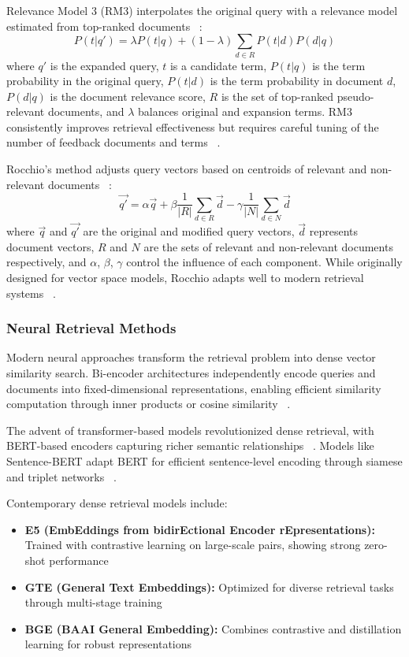 \documentclass[preprint,12pt]{elsarticle}
\begin{document}
Relevance Model 3 (RM3) interpolates the original query with a relevance model estimated from top-ranked documents ~\cite{abdul2004umass}:
\begin{equation}
P(t|q') = \lambda P(t|q) + (1-\lambda) \sum_{d \in R} P(t|d) P(d|q)
\end{equation}
where $q'$ is the expanded query, $t$ is a candidate term, $P(t|q)$ is the term probability in the original query, $P(t|d)$ is the term probability in document $d$, $P(d|q)$ is the document relevance score, $R$ is the set of top-ranked pseudo-relevant documents, and $\lambda$ balances original and expansion terms. RM3 consistently improves retrieval effectiveness but requires careful tuning of the number of feedback documents and terms ~\cite{lv2010empirical}.

Rocchio's method adjusts query vectors based on centroids of relevant and non-relevant documents ~\cite{rocchio1971relevance}:
\begin{equation}
\vec{q'} = \alpha \vec{q} + \beta \frac{1}{|R|} \sum_{d \in R} \vec{d} - \gamma \frac{1}{|N|} \sum_{d \in N} \vec{d}
\end{equation}
where $\vec{q}$ and $\vec{q'}$ are the original and modified query vectors, $\vec{d}$ represents document vectors, $R$ and $N$ are the sets of relevant and non-relevant documents respectively, and $\alpha$, $\beta$, $\gamma$ control the influence of each component. While originally designed for vector space models, Rocchio adapts well to modern retrieval systems ~\cite{cao2008selecting}.

\subsubsection{Neural Retrieval Methods}

Modern neural approaches transform the retrieval problem into dense vector similarity search. Bi-encoder architectures independently encode queries and documents into fixed-dimensional representations, enabling efficient similarity computation through inner products or cosine similarity ~\cite{karpukhin2020dense}.

The advent of transformer-based models revolutionized dense retrieval, with BERT-based encoders capturing richer semantic relationships ~\cite{devlin2019bert}. Models like Sentence-BERT adapt BERT for efficient sentence-level encoding through siamese and triplet networks ~\cite{reimers2019sentence}.

Contemporary dense retrieval models include:
\begin{itemize}
\item \textbf{E5 (EmbEddings from bidirEctional Encoder rEpresentations):} Trained with contrastive learning on large-scale pairs, showing strong zero-shot performance ~\cite{wang2024text}
\item \textbf{GTE (General Text Embeddings):} Optimized for diverse retrieval tasks through multi-stage training ~\cite{li2023towards}
\item \textbf{BGE (BAAI General Embedding):} Combines contrastive and distillation learning for robust representations ~\cite{chen2024bge}
\end{itemize}
\end{document}
